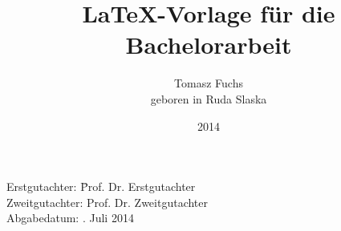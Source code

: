 





\usepackage{tikz}
\usetikzlibrary{calc, shapes, backgrounds}
\usepackage{amsmath, amssymb}

\newcommand{\thetitle}{\LaTeX-Vorlage für die Bachelorarbeit}
\newcommand{\Jahr}{2014}
\newcommand{\Geburtsort}{Castrop-Rauxel}
\newcommand{\Lehrstuhl}{Experimentelle Physik V}
\newcommand{\Betreuer}{Prof. Dr. Erstgutachter}
\newcommand{\Zweitgutachter}{Prof. Dr. Zweitgutachter}
\newcommand{\Abgabedatum}{11. Juli 2014}

\author{
    Tomasz Fuchs\\
    geboren in Ruda Slaska
}

\titlehead{
    \texttt{[image: logos/tu-logo.pdf]}
}
\title{\thetitle}
\date{\Jahr}

\subject{Arbeit zur Erlangung des akademischen Grades eines Doktors der Naturwissenschaften(Dr. rer. nat.)}
\publishers{Lehrstuhl für \Lehrstuhl \\ Fakultät Physik \\ Technische Universität Dortmund}




\frontmatter
\maketitle
\thispagestyle{empty}
\vspace*{\fill}
\begin{tabbing}
    Erstgutachter: \hspace{3em}\=   \Betreuer \\ 
    Zweitgutachter: \> \Zweitgutachter\\
    Abgabedatum: \>\Abgabedatum
\end{tabbing}
\newpage

